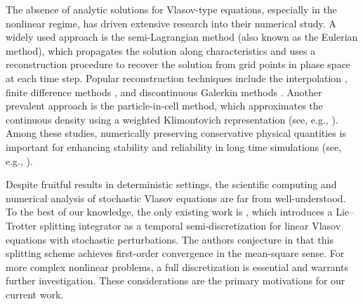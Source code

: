 \documentclass[11pt,reqno]{amsproc}
\numberwithin{equation}{section}
\begin{document}
The absence of analytic solutions for Vlasov-type equations, especially in the nonlinear regime, has driven extensive research into their numerical study.
A widely used approach is the semi-Lagrangian method (also known as the Eulerian method), which propagates the solution along characteristics  and uses a reconstruction procedure to recover the solution from grid points in phase space at each time step. Popular reconstruction techniques include the interpolation \cite{BN04, CK76}, finite difference methods \cite{QS11FDM}, and discontinuous Galerkin methods \cite{EO14, QS11}. Another prevalent approach is the particle-in-cell method, which approximates the continuous density using a weighted Klimontovich representation (see, e.g., \cite{LY23, LCHPS24, VA91}). Among these studies, numerically preserving conservative physical quantities is important for enhancing stability and reliability in long time simulations (see, e.g., \cite{EJ21}).

Despite fruitful results in deterministic settings, the scientific computing and numerical analysis of stochastic Vlasov equations are far from well-understood. To the best of our knowledge, the only existing work is \cite{BC24}, which introduces a Lie--Trotter splitting integrator as a temporal semi-discretization for linear Vlasov equations with stochastic perturbations. The authors conjecture in \cite{BC24} that this splitting scheme achieves first-order convergence in the mean-square sense. For more complex nonlinear problems, a full discretization is essential and warrants further investigation. These considerations are the primary motivations for our current work. 
\end{document}
